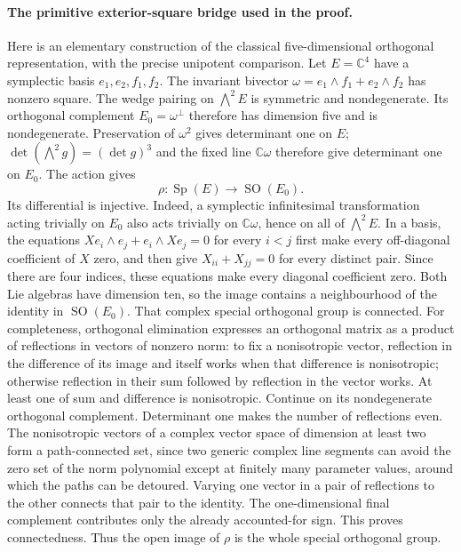 \documentclass[11pt,a4paper]{article}
\theoremstyle{definition}
\begin{document}
\paragraph{The primitive exterior-square bridge used in the proof.}
Here is an elementary construction of the classical five-dimensional
orthogonal representation, with the precise unipotent comparison.
Let $E=\mathbb C^4$ have a symplectic basis $e_1,e_2,f_1,f_2$.
The invariant bivector $\omega=e_1\wedge f_1+e_2\wedge f_2$ has
nonzero square. The wedge pairing on $\bigwedge^2E$ is symmetric
and nondegenerate. Its orthogonal complement
$E_0=\omega^\perp$ therefore has dimension five and is nondegenerate.
Preservation of $\omega^2$ gives determinant one on $E$;
$\det(\bigwedge^2g)=(\det g)^3$ and the fixed line
$\mathbb C\omega$ therefore give determinant one on $E_0$.
The action gives
\[
 \rho:\operatorname{Sp}(E)\longrightarrow\operatorname{SO}(E_0).
\]
Its differential is injective. Indeed, a symplectic infinitesimal
transformation acting trivially on $E_0$ also acts trivially on
$\mathbb C\omega$, hence on all of $\bigwedge^2E$. In a basis,
the equations $Xe_i\wedge e_j+e_i\wedge Xe_j=0$ for every $i<j$
first make every off-diagonal coefficient of $X$ zero, and then give
$X_{ii}+X_{jj}=0$ for every distinct pair. Since there are four
indices, these equations make every diagonal coefficient zero.
Both Lie algebras have dimension ten, so the image contains a
neighbourhood of the identity in $\operatorname{SO}(E_0)$.
That complex special orthogonal group is connected. For completeness,
orthogonal elimination expresses an orthogonal matrix as a product
of reflections in vectors of nonzero norm: to fix a nonisotropic
vector, reflection in the difference of its image and itself works
when that difference is nonisotropic; otherwise reflection in their
sum followed by reflection in the vector works. At least one of
sum and difference is nonisotropic. Continue on its nondegenerate
orthogonal complement. Determinant one makes the number of
reflections even. The nonisotropic vectors of a complex vector
space of dimension at least two form a path-connected set, since
two generic complex line segments can avoid the zero set of the
norm polynomial except at finitely many parameter values, around
which the paths can be detoured. Varying one vector in a pair of
reflections to the other connects that pair to the identity.
The one-dimensional final complement contributes only the already
accounted-for sign. This proves connectedness. Thus the open image
of $\rho$ is the whole special orthogonal group.
\end{document}
